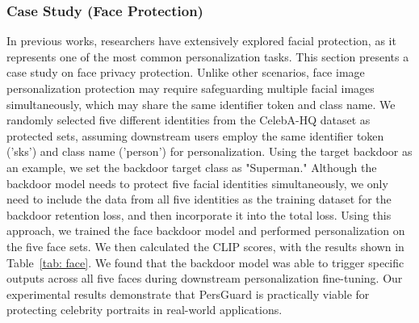 \subsubsection{Case Study (Face Protection)}
In previous works, researchers have extensively explored facial protection, as it represents one of the most common personalization tasks. This section presents a case study on face privacy protection. Unlike other scenarios, face image personalization protection may require safeguarding multiple facial images simultaneously, which may share the same identifier token and class name. We randomly selected five different identities from the CelebA-HQ dataset as protected sets, assuming downstream users employ the same identifier token ('sks') and class name ('person') for personalization. Using the target backdoor as an example, we set the backdoor target class as "Superman." Although the backdoor model needs to protect five facial identities simultaneously, we only need to include the data from all five identities as the training dataset for the backdoor retention loss, and then incorporate it into the total loss. Using this approach, we trained the face backdoor model and performed personalization on the five face sets. We then calculated the CLIP scores, with the results shown in Table~\ref{tab: face}. We found that the backdoor model was able to trigger specific outputs across all five faces during downstream personalization fine-tuning. Our experimental results demonstrate that PersGuard is practically viable for protecting celebrity portraits in real-world applications.






